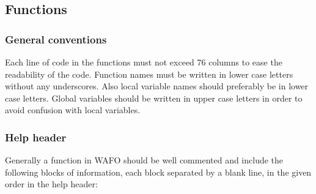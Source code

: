 \documentclass[10pt,a4paper]{article}   %
\begin{document}
\subsection{Functions }
\subsubsection{General conventions}
Each line of code in the functions must not exceed 76 columns
to ease the readability of the code. Function names must be written in lower case letters
without any underscores. Also local variable names should 
preferably be in lower case letters. Global variables should be written in 
upper case letters in order to avoid confusion with local variables. 

\subsubsection{Help header}
Generally a function in WAFO should be well commented and include the following
blocks of information, each block separated by a blank line, in the given order in the help header:
\end{document}
